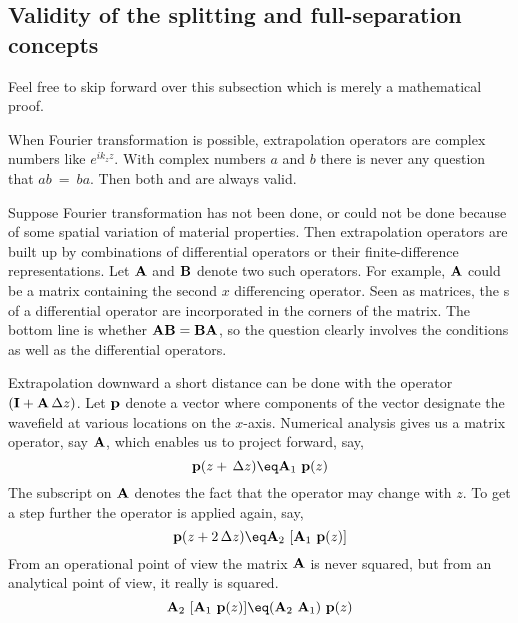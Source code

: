 \subsection{Validity of the splitting and full-separation concepts}
\par
Feel free to skip forward over this subsection
which is merely a mathematical proof.
\par
When Fourier transformation is possible,
extrapolation operators are 
complex numbers like  $e^{{i} k_z z}$.
With complex numbers  $a$  and  $b$  there
is never any question that  $ab\ =\ ba$.
Then both  and  are always valid.
\par
Suppose Fourier transformation has not been done,
or could not be done because of some spatial
variation of material properties.
Then extrapolation operators are built up
by combinations of
differential operators or their finite-difference representations.
Let  ${\bf A}$  and  ${\bf B}$  denote two such operators.
For example,  ${\bf A}$  could be a matrix containing
the second  $x$  differencing operator.
Seen as matrices,
the s of a
differential operator are incorporated in the corners of the matrix.
The bottom line is whether  ${\bf A}  {\bf B} = {\bf B} {\bf A}$,
so the question clearly involves the 
conditions as well as the differential operators.
\par
Extrapolation downward a short distance can be done
with the operator  $( {\bf I} + {\bf A} \, \Delta z )$.
Let  $ {\bf p}$  denote a vector where components of
the vector designate the wavefield at various locations on the $x$-axis.
Numerical analysis gives us a matrix operator, say  ${\bf A} $,  which
enables us to project forward, say,
\begin{equation}
{\bf p} (z + \, \Delta z)  \eq  \A_1 \  {\bf p} (z)
\end{equation}
The subscript on  ${\bf A}$  denotes the fact that
the operator may change with  $z$.
To get a step further the operator is applied again, say,
\begin{equation}
{\bf p} (z + 2 \, \Delta z)  \eq  \A_2 \  [ \A_1 \  {\bf p} (z)]
\end{equation}
From an operational point of view the matrix  ${\bf A}$  is never squared,
but from an analytical point of view,
it really is squared.
\begin{equation}
\A_2  \  [ \A_1 \  {\bf p} (z)]  \eq  ( \A_2  \  \A_1 ) \  {\bf p} (z)
\end{equation}
